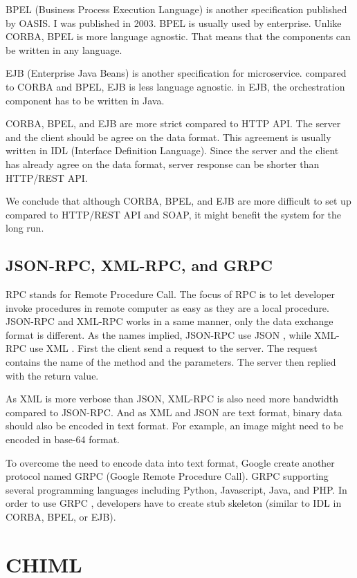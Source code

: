 \documentclass[conference]{IEEEtran}
\begin{document}
BPEL (Business Process Execution Language) is another specification published by OASIS. I was published in 2003. BPEL is usually used by enterprise. Unlike CORBA, BPEL is more language agnostic. That means that the components can be written in any language.

EJB (Enterprise Java Beans) is another specification for microservice. compared to CORBA and BPEL, EJB is less language agnostic. in EJB, the orchestration component has to be written in Java.

CORBA, BPEL, and EJB are more strict compared to HTTP API. The server and the client should be agree on the data format. This agreement is usually written in IDL (Interface Definition Language). Since the server and the client has already agree on the data format, server response can be shorter than HTTP/REST API.

We conclude that although CORBA, BPEL, and EJB are more difficult to set up compared to HTTP/REST API and SOAP, it might benefit the system for the long run.

\subsection{JSON-RPC, XML-RPC, and GRPC}

RPC stands for Remote Procedure Call. The focus of RPC is to let developer invoke procedures in remote computer as easy as they are a local procedure. JSON-RPC and XML-RPC works in a same manner, only the data exchange format is different. As the names implied, JSON-RPC use JSON \cite{jsonrpc}, while XML-RPC use XML \cite{xmlrpc}. First the client send a request to the server. The request contains the name of the method and the parameters. The server then replied with the return value.

As XML is more verbose than JSON, XML-RPC is also need more bandwidth compared to JSON-RPC. And as XML and JSON are text format, binary data should also be encoded in text format. For example, an image might need to be encoded in base-64 format.

To overcome the need to encode data into text format, Google create another protocol named GRPC (Google Remote Procedure Call). GRPC supporting several programming languages including Python, Javascript, Java, and PHP. In order to use GRPC \cite{grpc}, developers have to create stub skeleton (similar to IDL in CORBA, BPEL, or EJB).


\section{CHIML}
\end{document}
